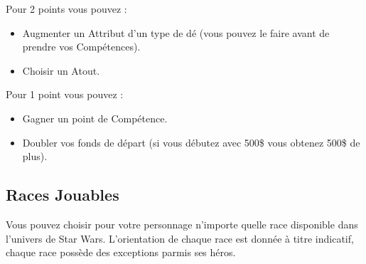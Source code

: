 Pour 2 points vous pouvez :
\begin{itemize}
    \item Augmenter un Attribut d’un type de dé (vous pouvez le faire avant de prendre vos Compétences).
    \item Choisir un Atout.
\end{itemize}

Pour 1 point vous pouvez :
\begin{itemize}
    \item Gagner un point de Compétence.
    \item Doubler vos fonds de départ (si vous débutez avec 500\$ vous obtenez 500\$ de plus).
\end{itemize}

\subsection{Races Jouables}
Vous pouvez choisir pour votre personnage n’importe quelle race disponible dans l'univers de Star Wars. L'orientation de chaque race est donnée à titre indicatif, chaque race possède des exceptions parmis ses héros.













%
%
\clearpage


\clearpage


\clearpage


\newpage


\clearpage 

